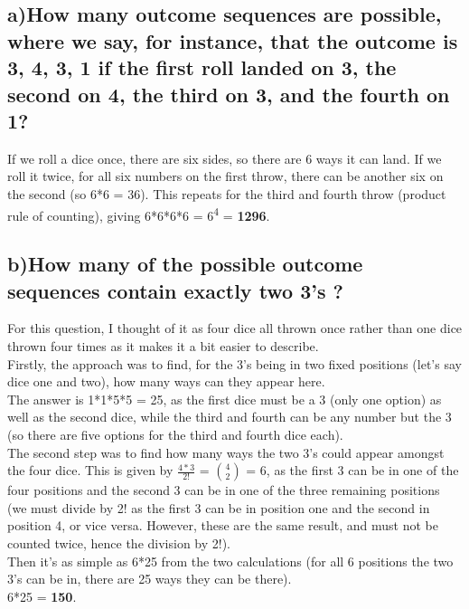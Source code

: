 \documentclass{report}
\begin{document}
		\subsection*{a)How many outcome sequences are possible, where we say, for instance, that the outcome is 3, 4, 3, 1 if the first roll landed on 3, the second on 4, the third on 3, and the fourth on 1?}
		If we roll a dice once, there are six sides, so there are 6 ways it can land. If we roll it twice, for all six numbers on the first throw, there can be another six on the second (so 6*6 = 36). This repeats for the third and fourth throw (product rule of counting), giving 6*6*6*6 = 6\textsuperscript{4} = \textbf{1296}.
		\subsection*{b)How many of the possible outcome sequences contain exactly two 3’s ?}
		For this question, I thought of it as four dice all thrown once rather than one dice thrown four times as it makes it a bit easier to describe.\\Firstly, the approach was to find, for the 3's being in two fixed positions (let's say dice one and two), how many ways can they appear here.\\The answer is 1*1*5*5 = 25, as the first dice must be a 3 (only one option) as well as the second dice, while the third and fourth can be any number but the 3 (so there are five options for the third and fourth dice each).\\The second step was to find how many ways the two 3's could appear amongst the four dice. This is given by $\frac{4*3}{2!}$ = ${4 \choose 2}$ = 6, as the first 3 can be in one of the four positions and the second 3 can be in one of the three remaining positions (we must divide by 2! as the first 3 can be in position one and the second in position 4, or vice versa. However, these are the same result, and must not be counted twice, hence the division by 2!).\\Then it's as simple as 6*25 from the two calculations (for all 6 positions the two 3's can be in, there are 25 ways they can be there).\\6*25 = \textbf{150}.
\end{document}
